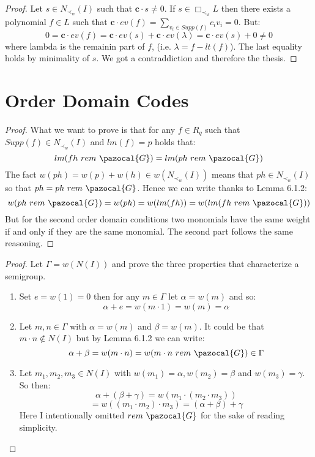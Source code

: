 \documentclass[11pt,a4paper]{report}
\theoremstyle{plain}
\theoremstyle{definition}
\newcommand{\G}{\pazocal{G}}
\begin{document}
\begin{ex-hand}[5.8.14]
\end{ex-hand}
\begin{proof}
	Let $s \in N_{\prec_w}(I)$ such that $\textbf{c}\cdot s \ne 0$. If $s \in \Box_{\prec_w}L$ then there exists a polynomial $f \in L$ such that $\textbf{c}\cdot ev(f) = \sum\limits_{v_i \in Supp(f)}c_iv_i = 0$. But:
	\[
		0 = \textbf{c}\cdot ev(f) = \textbf{c}\cdot ev(s) + \textbf{c}\cdot ev(\lambda)	 = \textbf{c}\cdot ev(s) + 0 \ne 0
	\]
	where lambda is the remainin part of $f$, (i.e. $\lambda = f - lt(f)$). The last equality holds by minimality of $s$. We got a contraddiction and therefore the thesis.
\end{proof}
\chapter{Order Domain Codes}
\begin{prop-hand}[6.1.6]
\end{prop-hand}
\begin{proof}
	What we want to prove is that for any $f \in R_q$ such that $Supp(f) \in N_{\prec_w}(I)$ and $lm(f) = p$ holds that:
	\[
		lm(fh\ rem\ \G) = lm(ph\ rem\ \G)	
	\]
	 The fact $w(ph) = w(p) + w(h) \in w(N_{\prec_w}(I))$ means that $ph \in N_{\prec_w}(I)$ so that $ph = ph\ rem\ \G$. Hence we can write thanks to Lemma 6.1.2:
	\[
		w(ph\ rem\ \G) = w(ph) = w(lm(fh)) = w(lm(fh\ rem\ \G))
	\]
	But for the second order domain conditions two monomials have the same weight if and only if they are the same monomial. 
	The second part follows the same reasoning.
\end{proof}

\begin{ex-hand}[6.5.3]
\end{ex-hand}
\begin{proof}
	Let $\Gamma = w(N(I))$ and prove the three properties that characterize a semigroup.
	\begin{enumerate}
		\item Set $e = w(1) = 0$ then for any $m\in \Gamma$ let $\alpha = w(m)$ and so:
			\[
				\alpha + e = w(m\cdot1) = w(m) = \alpha 			
			\]
		\item Let $m,n \in \Gamma$ with $\alpha = w(m)$ and $\beta = w(m)$. It could be that $m\cdot n \notin N(I)$ but by Lemma 6.1.2 we can write:
		\[
			\alpha + \beta = w(m\cdot n) = w(m\cdot n\ rem\ \G) \in \Gamma		
		\]
		\item Let $m_1,m_2,m_3 \in N(I)$ with $w(m_1) = \alpha, w(m_2) = \beta$ and $w(m_3) = \gamma$. So then:
		\[
			\alpha + (\beta + \gamma)	 = w(m_1\cdot(m_2\cdot m_3)) 
		\]
		\[
			= w((m_1\cdot m_2)\cdot m_3) = (\alpha + \beta) + \gamma
		\]
		Here I intentionally omitted $rem\ \G$ for the sake of reading simplicity.
	\end{enumerate}
\end{proof}
\end{document}
